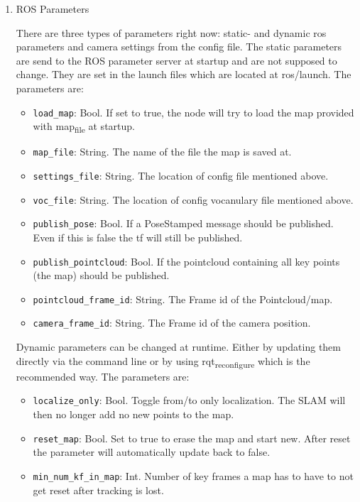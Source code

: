 \documentclass[unrestricted]{meetingnotesminutes}
\begin{document}
\begin{enumerate}
\item ROS Parameters
\label{sec:org01eca52}

There are three types of parameters right now: static- and dynamic ros parameters and camera settings from the config file. The static parameters are send to the ROS parameter server at startup and are not supposed to change. They are set in the launch files which are located at ros/launch. The parameters are:

\begin{itemize}
\item \texttt{load\_map}: Bool. If set to true, the node will try to load the map provided with map\textsubscript{file} at startup.
\item \texttt{map\_file}: String. The name of the file the map is saved at.
\item \texttt{settings\_file}: String. The location of config file mentioned above.
\item \texttt{voc\_file}: String. The location of config vocanulary file mentioned above.
\item \texttt{publish\_pose}: Bool. If a PoseStamped message should be published. Even if this is false the tf will still be published.
\item \texttt{publish\_pointcloud}: Bool. If the pointcloud containing all key points (the map) should be published.
\item \texttt{pointcloud\_frame\_id}: String. The Frame id of the Pointcloud/map.
\item \texttt{camera\_frame\_id}: String. The Frame id of the camera position.
\end{itemize}

Dynamic parameters can be changed at runtime. Either by updating them directly via the command line or by using rqt\textsubscript{reconfigure} which is the recommended way. The parameters are:

\begin{itemize}
\item \texttt{localize\_only}: Bool. Toggle from/to only localization. The SLAM will then no longer add no new points to the map.
\item \texttt{reset\_map}: Bool. Set to true to erase the map and start new. After reset the parameter will automatically update back to false.
\item \texttt{min\_num\_kf\_in\_map}: Int. Number of key frames a map has to have to not get reset after tracking is lost.
\end{itemize}


\end{enumerate}
\end{document}
